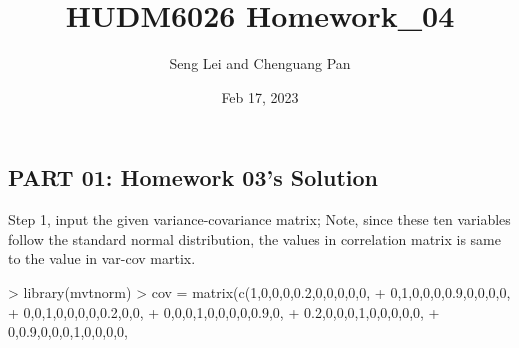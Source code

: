 \documentclass[
]{article}
\title{HUDM6026 Homework\_04}
\author{Seng Lei and Chenguang Pan}
\date{Feb 17, 2023}
\newenvironment{Shaded}{\begin{snugshade}}{\end{snugshade}}
\newcommand{\DecValTok}[1]{\textcolor[rgb]{0.00,0.00,0.81}{#1}}
\newcommand{\FloatTok}[1]{\textcolor[rgb]{0.00,0.00,0.81}{#1}}
\newcommand{\FunctionTok}[1]{\textcolor[rgb]{0.00,0.00,0.00}{#1}}
\newcommand{\NormalTok}[1]{#1}
\newcommand{\OtherTok}[1]{\textcolor[rgb]{0.56,0.35,0.01}{#1}}
\newcommand{\SpecialCharTok}[1]{\textcolor[rgb]{0.00,0.00,0.00}{#1}}
\begin{document}
\maketitle

\hypertarget{part-01-homework-03s-solution}{%
\subsection{PART 01: Homework 03's
Solution}\label{part-01-homework-03s-solution}}

Step 1, input the given variance-covariance matrix; Note, since these
ten variables follow the standard normal distribution, the values in
correlation matrix is same to the value in var-cov martix.

\begin{Shaded}
\begin{Highlighting}[]
\SpecialCharTok{\textgreater{}} \FunctionTok{library}\NormalTok{(mvtnorm)}
\SpecialCharTok{\textgreater{}}\NormalTok{ cov }\OtherTok{=} \FunctionTok{matrix}\NormalTok{(}\FunctionTok{c}\NormalTok{(}\DecValTok{1}\NormalTok{,}\DecValTok{0}\NormalTok{,}\DecValTok{0}\NormalTok{,}\DecValTok{0}\NormalTok{,}\FloatTok{0.2}\NormalTok{,}\DecValTok{0}\NormalTok{,}\DecValTok{0}\NormalTok{,}\DecValTok{0}\NormalTok{,}\DecValTok{0}\NormalTok{,}\DecValTok{0}\NormalTok{,}
\SpecialCharTok{+}                \DecValTok{0}\NormalTok{,}\DecValTok{1}\NormalTok{,}\DecValTok{0}\NormalTok{,}\DecValTok{0}\NormalTok{,}\DecValTok{0}\NormalTok{,}\FloatTok{0.9}\NormalTok{,}\DecValTok{0}\NormalTok{,}\DecValTok{0}\NormalTok{,}\DecValTok{0}\NormalTok{,}\DecValTok{0}\NormalTok{,}
\SpecialCharTok{+}                \DecValTok{0}\NormalTok{,}\DecValTok{0}\NormalTok{,}\DecValTok{1}\NormalTok{,}\DecValTok{0}\NormalTok{,}\DecValTok{0}\NormalTok{,}\DecValTok{0}\NormalTok{,}\DecValTok{0}\NormalTok{,}\FloatTok{0.2}\NormalTok{,}\DecValTok{0}\NormalTok{,}\DecValTok{0}\NormalTok{,}
\SpecialCharTok{+}                \DecValTok{0}\NormalTok{,}\DecValTok{0}\NormalTok{,}\DecValTok{0}\NormalTok{,}\DecValTok{1}\NormalTok{,}\DecValTok{0}\NormalTok{,}\DecValTok{0}\NormalTok{,}\DecValTok{0}\NormalTok{,}\DecValTok{0}\NormalTok{,}\FloatTok{0.9}\NormalTok{,}\DecValTok{0}\NormalTok{,}
\SpecialCharTok{+}                \FloatTok{0.2}\NormalTok{,}\DecValTok{0}\NormalTok{,}\DecValTok{0}\NormalTok{,}\DecValTok{0}\NormalTok{,}\DecValTok{1}\NormalTok{,}\DecValTok{0}\NormalTok{,}\DecValTok{0}\NormalTok{,}\DecValTok{0}\NormalTok{,}\DecValTok{0}\NormalTok{,}\DecValTok{0}\NormalTok{,}
\SpecialCharTok{+}                \DecValTok{0}\NormalTok{,}\FloatTok{0.9}\NormalTok{,}\DecValTok{0}\NormalTok{,}\DecValTok{0}\NormalTok{,}\DecValTok{0}\NormalTok{,}\DecValTok{1}\NormalTok{,}\DecValTok{0}\NormalTok{,}\DecValTok{0}\NormalTok{,}\DecValTok{0}\NormalTok{,}\DecValTok{0}\NormalTok{,}

\end{Highlighting}
\end{Shaded}
\end{document}
